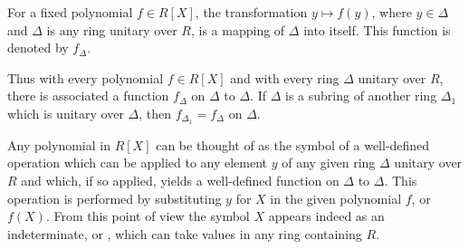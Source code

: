 For a fixed polynomial $f \in R[X]$, the transformation $y \mapsto f(y)$, where $y \in \Delta$ and $\Delta$ is any ring unitary over $R$, is a mapping of $\Delta$ into itself. This function is denoted by $f_{\Delta}$.

Thus with every polynomial $f \in R[X]$ and with every ring $\Delta$ unitary over $R$, there is associated a function $f_{\Delta}$ on $\Delta$ to $\Delta$. If $\Delta$ is a subring of another ring $\Delta_1$ which is unitary over $\Delta$, then $f_{\Delta_1} = f_{\Delta}$ on $\Delta$.

Any polynomial in $R[X]$ can be thought of as the symbol of a well-defined operation which can be applied to any element $y$ of any given ring $\Delta$ unitary over $R$ and which, if so applied, yields a well-defined function on $\Delta$ to $\Delta$. This operation is performed by substituting $y$ for $X$ in the given polynomial $f$, or $f(X)$. From this point of view the symbol $X$ appears indeed as an indeterminate, or , which can take values in any ring containing $R$.
